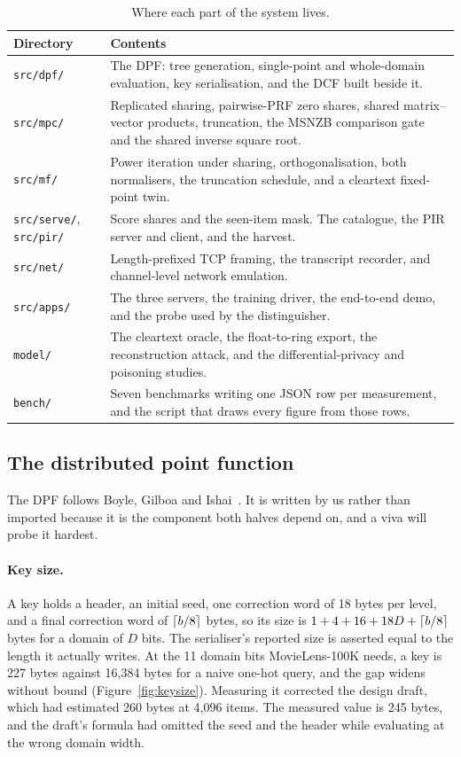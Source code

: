 \begin{table}[t]
\centering
\small
\caption{Where each part of the system lives.}
\label{tab:layout}
\begin{tabular}{@{}l p{11.2cm}@{}}
\toprule
Directory & Contents \\
\midrule
\texttt{src/dpf/} & The DPF: tree generation, single-point and whole-domain
  evaluation, key serialisation, and the DCF built beside it. \\
\texttt{src/mpc/} & Replicated sharing, pairwise-PRF zero shares, shared
  matrix--vector products, truncation, the MSNZB comparison gate and the
  shared inverse square root. \\
\texttt{src/mf/} & Power iteration under sharing, orthogonalisation, both
  normalisers, the truncation schedule, and a cleartext fixed-point twin. \\
\texttt{src/serve/}, \texttt{src/pir/} & Score shares and the seen-item mask.
  The catalogue, the PIR server and client, and the harvest. \\
\texttt{src/net/} & Length-prefixed TCP framing, the transcript recorder, and
  channel-level network emulation. \\
\texttt{src/apps/} & The three servers, the training driver, the end-to-end
  demo, and the probe used by the distinguisher. \\
\texttt{model/} & The cleartext oracle, the float-to-ring export, the
  reconstruction attack, and the differential-privacy and poisoning studies. \\
\texttt{bench/} & Seven benchmarks writing one JSON row per measurement, and the
  script that draws every figure from those rows. \\
\bottomrule
\end{tabular}
\end{table}

\subsection{The distributed point function}
\label{sec:impl:dpf}

The DPF follows Boyle, Gilboa and Ishai~\cite{bgi2016}. It is written by us
rather than imported because it is the component both halves depend on, and a
viva will probe it hardest.

\paragraph{Key size.} A key holds a header, an initial seed, one correction word
of 18 bytes per level, and a final correction word of $\lceil b/8 \rceil$
bytes, so its size is $1 + 4 + 16 + 18D + \lceil b/8 \rceil$ bytes for a
domain of $D$ bits. The serialiser's reported size is asserted equal to the
length it actually writes. At the 11 domain bits MovieLens-100K needs, a key is
227 bytes against 16{,}384 bytes for a naive one-hot query, and the gap widens
without bound (Figure~\ref{fig:keysize}). Measuring it corrected the design
draft, which had estimated 260 bytes at 4{,}096 items. The measured value is 245
bytes, and the draft's formula had omitted the seed and the header while
evaluating at the wrong domain width.


